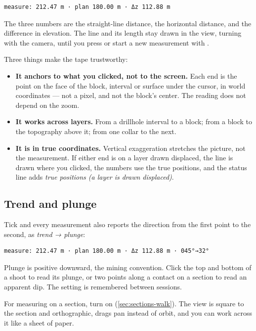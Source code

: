 \begin{lstlisting}
measure: 212.47 m · plan 180.00 m · Δz 112.88 m
\end{lstlisting}

The three numbers are the straight-line distance, the horizontal distance, and the difference in elevation. The line and its length stay drawn in the view, turning with the camera, until you press  or start a new measurement with .

Three things make the tape trustworthy:

\begin{itemize}
\item \textbf{It anchors to what you clicked, not to the screen.} Each end is the point on the face of the block, interval or surface under the cursor, in world coordinates — not a pixel, and not the block's center. The reading does not depend on the zoom.
\item \textbf{It works across layers.} From a drillhole interval to a block; from a block to the topography above it; from one collar to the next.
\item \textbf{It is in true coordinates.} Vertical exaggeration stretches the picture, not the measurement. If either end is on a layer drawn displaced, the line is drawn where you clicked, the numbers use the true positions, and the status line adds \emph{true positions (a layer is drawn displaced)}.
\end{itemize}

\subsection{Trend and plunge}
Tick  and every measurement also reports the direction from the first point to the second, as \emph{trend → plunge}:

\begin{lstlisting}
measure: 212.47 m · plan 180.00 m · Δz 112.88 m · 045°→32°
\end{lstlisting}

Plunge is positive downward, the mining convention. Click the top and bottom of a shoot to read its plunge, or two points along a contact on a section to read an apparent dip. The setting is remembered between sessions.

\begin{tip}
For measuring on a section, turn on  (\cref{sec:sections-walk}). The view is square to the section and orthographic, drags pan instead of orbit, and you can work across it like a sheet of paper.
\end{tip}

